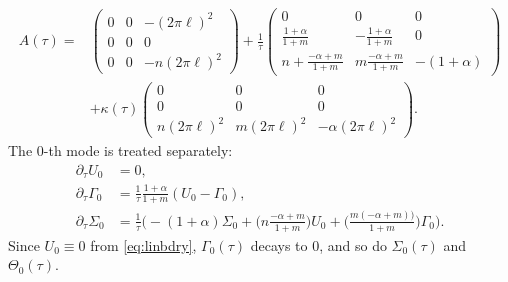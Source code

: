 \documentclass[a4paper,11pt]{article}
\def\l{(2\pi \ell)}
\theoremstyle{remark}
\begin{document}
\begin{equation}
\begin{aligned}
  A(\tau)=
  &\begin{pmatrix}
   0 & 0 & -\l^2\\
   0 & 0 & 0\\
   0 & 0 & -n\l^2 
  \end{pmatrix} 
  + \frac{1}{\tau}   \begin{pmatrix}
   0 & 0 & 0\\
   \frac{1+\alpha}{1+m} & -\frac{1+\alpha}{1+m} & 0\\
   n+ \frac{-\alpha+m}{1+m} & m\frac{-\alpha+m}{1+m}& -(1+\alpha)
  \end{pmatrix}\\
  &+\kappa(\tau) \begin{pmatrix}
   0 & 0 & 0\\
   0 & 0 & 0\\
   n\l^2 & m\l^2 & -\alpha\l^2 
  \end{pmatrix}.%
\end{aligned} \label{eq:A(tau)}
\end{equation}
The $0$-th mode is treated separately:
\begin{align*}
   \partial_\tau U_0 &= 0,\\
  \partial_\tau\Gamma_0 &= \frac{1}{\tau}\frac{1+\alpha}{1+m}(U_0-\Gamma_0),\\
  \partial_\tau\Sigma_0 &= \frac{1}{\tau}\Big( -(1+\alpha)\Sigma_0 + \big(n\frac{-\alpha+m}{1+m}\big)U_0 + \big(\frac{m(-\alpha+m))}{1+m}\big)\Gamma_0\Big).
\end{align*}
Since $U_0\equiv0$ from \eqref{eq:linbdry}, $\Gamma_0(\tau)$ decays to $0$, and so do $\Sigma_0(\tau)$ and $\Theta_0(\tau)$.
% 
% 
\end{document}
